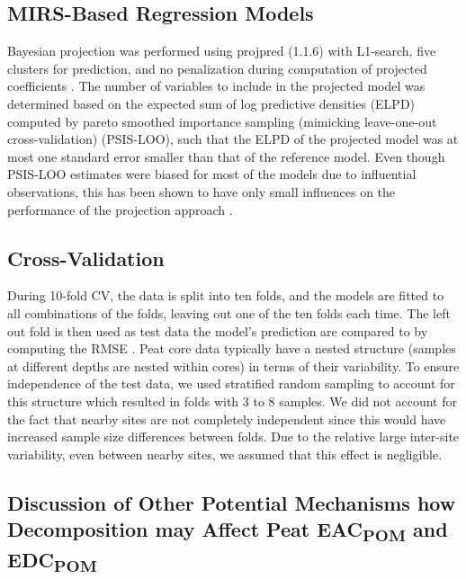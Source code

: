 \documentclass[alpha-refs]{wiley-article-rmd}
\begin{document}
\begin{refsection}
\hypertarget{mirs-based-regression-models}{%
\subsection{MIRS-Based Regression Models}\label{mirs-based-regression-models}}

Bayesian projection was performed using projpred (1.1.6) \autocite{Piironen.2019} with L1-search, five clusters for prediction, and no penalization during computation of projected coefficients \autocite{Piironen.2019,Piironen.2020}. The number of variables to include in the projected model was determined based on the expected sum of log predictive densities (ELPD) computed by pareto smoothed importance sampling (mimicking leave-one-out cross-validation) (PSIS-LOO), such that the ELPD of the projected model was at most one standard error smaller than that of the reference model. Even though PSIS-LOO estimates were biased for most of the models due to influential observations, this has been shown to have only small influences on the performance of the projection approach \autocite{Piironen.2020}.

\hypertarget{cross-validation}{%
\subsection{Cross-Validation}\label{cross-validation}}

During 10-fold CV, the data is split into ten folds, and the models are fitted to all combinations of the folds, leaving out one of the ten folds each time. The left out fold is then used as test data the model's prediction are compared to by computing the RMSE \autocite{Roberts.2017}. Peat core data typically have a nested structure (samples at different depths are nested within cores) in terms of their variability. To ensure independence of the test data, we used stratified random sampling to account for this structure \autocite{Roberts.2017} which resulted in folds with 3 to 8 samples. We did not account for the fact that nearby sites are not completely independent since this would have increased sample size differences between folds. Due to the relative large inter-site variability, even between nearby sites, we assumed that this effect is negligible.

\hypertarget{discussion-of-other-potential-mechanisms-how-decomposition-may-affect-peat-eac-and-edc}{%
\subsection{\texorpdfstring{Discussion of Other Potential Mechanisms how Decomposition may Affect Peat EAC\textsubscript{POM} and EDC\textsubscript{POM}}{Discussion of Other Potential Mechanisms how Decomposition may Affect Peat EAC and EDC}}\label{discussion-of-other-potential-mechanisms-how-decomposition-may-affect-peat-eac-and-edc}}


\end{refsection}
\end{document}
